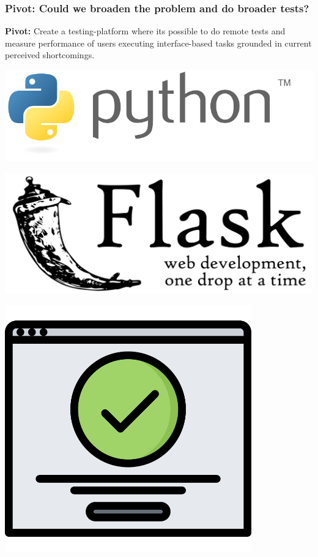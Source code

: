 \documentclass[xcolor=svgnames,10pt,aspectratio=1610]{beamer}
\begin{document}
\begin{frame}
  \frametitle{Pivot: Could we broaden the problem and do broader tests?}
  \begin{minipage}{.49\textwidth}
    \textbf{Pivot:}
    Create a testing-platform where its possible to do remote tests and measure
    performance of users executing interface-based tasks grounded in current
    perceived shortcomings.
    \vspace{0.5cm} \\
    \begin{minipage}{0.49\textwidth}
      \centering
      \includegraphics[width=1.0\textwidth]{img/python.pdf}
    \end{minipage}
    \begin{minipage}{0.49\textwidth}
      \centering
      \includegraphics[width=1.0\textwidth]{img/flask.pdf}
    \end{minipage}
  \end{minipage}
  \begin{minipage}{.49\textwidth}
    \hspace{1.5cm}\includegraphics[width=0.8\textwidth]{img/success.pdf}
  \end{minipage}
\end{frame}
\end{document}
